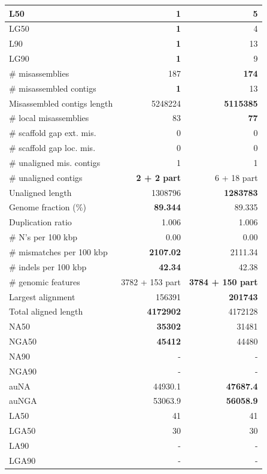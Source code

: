 \documentclass[12pt,a4paper]{article}
\begin{document}
\begin{table}[ht]
\begin{center}
\begin{tabular}{|l*{2}{|r}|}
L50 & {\bf 1} & 5 \\ \hline
LG50 & {\bf 1} & 4 \\ \hline
L90 & {\bf 1} & 13 \\ \hline
LG90 & {\bf 1} & 9 \\ \hline
\# misassemblies & 187 & {\bf 174} \\ \hline
\# misassembled contigs & {\bf 1} & 13 \\ \hline
Misassembled contigs length & 5248224 & {\bf 5115385} \\ \hline
\# local misassemblies & 83 & {\bf 77} \\ \hline
\# scaffold gap ext. mis. & 0 & 0 \\ \hline
\# scaffold gap loc. mis. & 0 & 0 \\ \hline
\# unaligned mis. contigs & 1 & 1 \\ \hline
\# unaligned contigs & {\bf 2 + 2 part} & 6 + 18 part \\ \hline
Unaligned length & 1308796 & {\bf 1283783} \\ \hline
Genome fraction (\%) & {\bf 89.344} & 89.335 \\ \hline
Duplication ratio & 1.006 & 1.006 \\ \hline
\# N's per 100 kbp & 0.00 & 0.00 \\ \hline
\# mismatches per 100 kbp & {\bf 2107.02} & 2111.34 \\ \hline
\# indels per 100 kbp & {\bf 42.34} & 42.38 \\ \hline
\# genomic features & 3782 + 153 part & {\bf 3784 + 150 part} \\ \hline
Largest alignment & 156391 & {\bf 201743} \\ \hline
Total aligned length & {\bf 4172902} & 4172128 \\ \hline
NA50 & {\bf 35302} & 31481 \\ \hline
NGA50 & {\bf 45412} & 44480 \\ \hline
NA90 & - & - \\ \hline
NGA90 & - & - \\ \hline
auNA & 44930.1 & {\bf 47687.4} \\ \hline
auNGA & 53063.9 & {\bf 56058.9} \\ \hline
LA50 & 41 & 41 \\ \hline
LGA50 & 30 & 30 \\ \hline
LA90 & - & - \\ \hline
LGA90 & - & - \\ \hline
\end{tabular}
\end{center}
\end{table}
\end{document}
